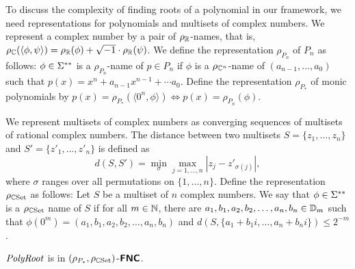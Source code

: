 \documentclass[envcountsect,envcountsame,orivec,oribibl]{llncs}
\begin{document}
To discuss the complexity of finding roots of a polynomial in our framework,
we need representations for polynomials and multisets of complex numbers.
We represent a complex number by a pair of $\rho _\mathbb R$-names,
that is, $
 \rho_\mathbb C (\langle \phi, \psi \rangle) 
= 
 \rho _\mathbb R (\phi) + \sqrt{-1} \cdot \rho _\mathbb R (\psi)
$.  We define the representation $\rho_{P_n}$ of 
$P _n$ as follows: 
$\phi \in \Sigma ^{**}$ is a $\rho_{P_n}$-name of $p \in P_n$ 
if $\phi$ is a $\rho_{\mathbb C^n}$-name of $(a_{n-1}, \dots, a_0)$ 
such that $p(x) = x^n + a_{n-1}x^{n-1} + \cdots a_0$.
Define the representation $\rho_{P_*}$ of monic polynomials by
$p(x) = \rho_{P_*}(\langle 0^n, \phi \rangle) \iff p(x) = \rho_{P_n}(\phi)$.

We represent multisets of complex numbers as converging sequences of 
multisets of rational complex numbers.
The distance between two multisets $S = \{z_1, \dots, z_n\}$
and $S' = \{z'_1, \dots, z'_n\}$ is defined as
\begin{equation}
d(S, S') = \min_{\sigma} \max_{j = 1, \ldots, n}|z_j - z'_{\sigma(j)}|,
\end{equation}
where $\sigma$ ranges over all permutations on $\{1, \ldots, n\}$. 
Define the representation $\rho_{\mathbb C\mathrm{Set}}$ as follows:
Let $S$ be a multiset of $n$ complex numbers. 
We say that $\phi \in \Sigma ^{**}$ is a $\rho_{\mathbb C\mathrm{Set}}$ name of $S$ if
for all $m \in \mathbb N$, there are $a_1, b_1, a_2, b_2, \dots, a_n, b_n \in \mathbb D_m$
such that $\phi(0^m) = ( a_1, b_1, a_2, b_2, \dots, a_n, b_n )$
and $d(S, \{a_1 + b_1 i, \dots, a_n + b_n i\}) \le 2^{-m}$.


\begin{theorem}
 \label{theorem:finding-roots-is-in-NC}
 $\mathit{PolyRoot}$ is in $(\rho_{P_*}, \rho_{\mathbb C\mathrm{Set}})$-$\text{\bfseries \sffamily \upshape FNC}$.
\end{theorem}
\end{document}
